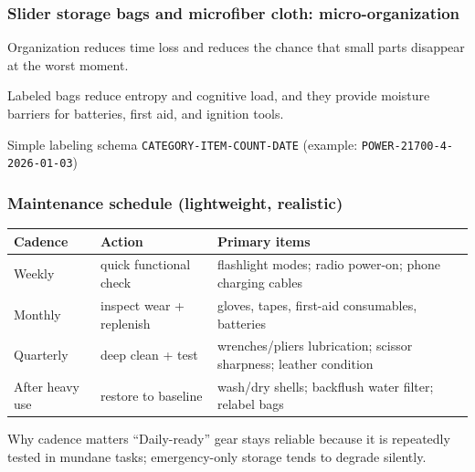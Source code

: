 \begin{frame}[t]
  \frametitle{Slider storage bags and microfiber cloth: micro-organization}
  \justifying
   Organization reduces time loss and reduces the chance that small parts disappear at the worst moment.

  \vspace{0.5em}
   Labeled bags reduce entropy and cognitive load, and they provide moisture barriers for batteries, first aid, and ignition tools.

  \vspace{0.8em}
  \begin{block}{Simple labeling schema}
    \texttt{CATEGORY-ITEM-COUNT-DATE} (example: \texttt{POWER-21700-4-2026-01-03})
  \end{block}
\end{frame}

\begin{frame}[t,shrink=6]
  \frametitle{Maintenance schedule (lightweight, realistic)}
  \justifying
  \DenseBodySize
  \begin{table}
    \centering
    \begin{tabularx}{\textwidth}{@{}lX X@{}}
      \toprule
      \textbf{Cadence} & \textbf{Action} & \textbf{Primary items} \\
      \midrule
      Weekly & quick functional check & flashlight modes; radio power-on; phone charging cables \\
      Monthly & inspect wear + replenish & gloves, tapes, first-aid consumables, batteries \\
      Quarterly & deep clean + test & wrenches/pliers lubrication; scissor sharpness; leather condition \\
      After heavy use & restore to baseline & wash/dry shells; backflush water filter; relabel bags \\
      \bottomrule
    \end{tabularx}
  \end{table}

  \vspace{0.6em}
  \begin{block}{Why cadence matters}
    ``Daily-ready'' gear stays reliable because it is repeatedly tested in mundane tasks; emergency-only storage tends to degrade silently.
  \end{block}
\end{frame}

